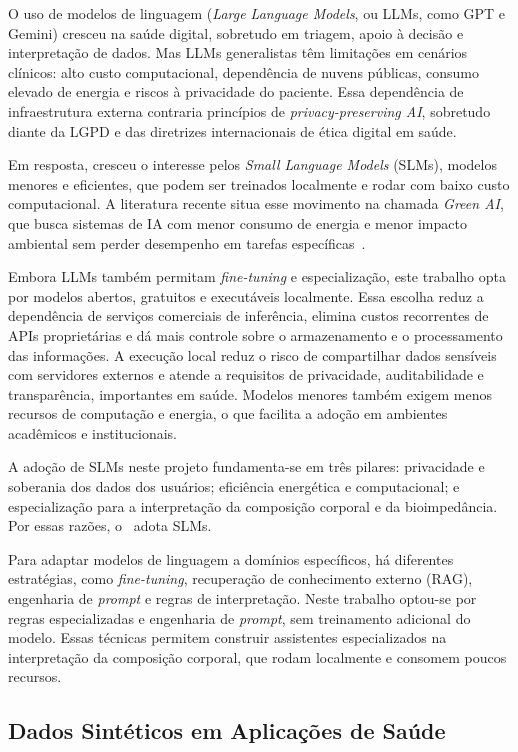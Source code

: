 O uso de modelos de linguagem (\emph{Large Language Models}, ou LLMs, como GPT e Gemini)
cresceu na saúde digital, sobretudo em triagem, apoio à decisão e interpretação de dados.
Mas LLMs generalistas têm limitações em cenários clínicos: alto custo computacional,
dependência de nuvens públicas, consumo elevado de energia e riscos à privacidade do
paciente. Essa dependência de infraestrutura externa contraria princípios de
\emph{privacy-preserving AI}, sobretudo diante da LGPD e das diretrizes internacionais de
ética digital em saúde.

Em resposta, cresceu o interesse pelos \emph{Small Language Models} (SLMs), modelos
menores e eficientes, que podem ser treinados localmente e rodar com baixo custo
computacional. A literatura recente situa esse movimento na chamada \emph{Green AI}, que
busca sistemas de IA com menor consumo de energia e menor impacto ambiental sem perder
desempenho em tarefas específicas~\cite{schwartz2020,hooker2021}.

Embora LLMs também permitam \emph{fine-tuning} e especialização, este trabalho opta por
modelos abertos, gratuitos e executáveis localmente. Essa escolha reduz a dependência de
serviços comerciais de inferência, elimina custos recorrentes de APIs proprietárias e dá
mais controle sobre o armazenamento e o processamento das informações. A execução local
reduz o risco de compartilhar dados sensíveis com servidores externos e atende a
requisitos de privacidade, auditabilidade e transparência, importantes em saúde. Modelos
menores também exigem menos recursos de computação e energia, o que facilita a adoção em
ambientes acadêmicos e institucionais.

A adoção de SLMs neste projeto fundamenta-se em três pilares: privacidade e soberania dos
dados dos usuários; eficiência energética e computacional; e especialização para a
interpretação da composição corporal e da bioimpedância. Por essas razões, o \sintonia\
adota SLMs.

Para adaptar modelos de linguagem a domínios específicos, há diferentes estratégias, como
\emph{fine-tuning}, recuperação de conhecimento externo (RAG), engenharia de \emph{prompt}
e regras de interpretação. Neste trabalho optou-se por regras especializadas e engenharia
de \emph{prompt}, sem treinamento adicional do modelo. Essas técnicas permitem construir
assistentes especializados na interpretação da composição corporal, que rodam localmente e
consomem poucos recursos.

\subsection{Dados Sintéticos em Aplicações de Saúde}

